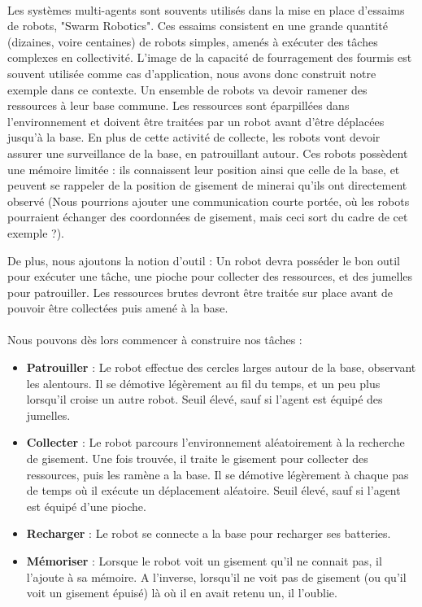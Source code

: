 		\paragraph{}
			Les systèmes multi-agents sont souvents utilisés dans la mise en place d'essaims de robots, "Swarm Robotics". Ces essaims consistent en une grande quantité (dizaines, voire centaines) de robots simples, amenés à exécuter des tâches complexes en collectivité. L'image de la capacité de fourragement des fourmis est souvent utilisée comme cas d'application, nous avons donc construit notre exemple dans ce contexte. Un ensemble de robots va devoir ramener des ressources à leur base commune. Les ressources sont éparpillées dans l'environnement et doivent être traitées par un robot avant d'être déplacées jusqu'à la base. En plus de cette activité de collecte, les robots vont devoir assurer une surveillance de la base, en patrouillant autour. Ces robots possèdent une mémoire limitée : ils connaissent leur position ainsi que celle de la base, et peuvent se rappeler de la position de gisement de minerai qu'ils ont directement observé (Nous pourrions ajouter une communication courte portée, où les robots pourraient échanger des coordonnées de gisement, mais ceci sort du cadre de cet exemple ?).
			
		De plus, nous ajoutons la notion d'outil : Un robot devra posséder le bon outil pour exécuter une tâche, une pioche pour collecter des ressources, et des jumelles pour patrouiller. Les ressources brutes devront être traitée sur place avant de pouvoir être collectées puis amené à la base.

		\paragraph{}
		Nous pouvons dès lors commencer à construire nos tâches :
		\begin{itemize}
			\item \textbf{Patrouiller} : Le robot effectue des cercles larges autour de la base, observant les alentours. Il se démotive légèrement au fil du temps, et un peu plus lorsqu'il croise un autre robot. Seuil élevé, sauf si l'agent est équipé des jumelles.
			\item \textbf{Collecter} : Le robot parcours l'environnement aléatoirement à la recherche de gisement. Une fois trouvée, il traite le gisement pour collecter des ressources, puis les ramène a la base. Il se démotive légèrement à chaque pas de temps où il exécute un déplacement aléatoire. Seuil élevé, sauf si l'agent est équipé d'une pioche.
			\item \textbf{Recharger} : Le robot se connecte a la base pour recharger ses batteries.
			\item \textbf{Mémoriser} : Lorsque le robot voit un gisement qu'il ne connait pas, il l'ajoute à sa mémoire. A l'inverse, lorsqu'il ne voit pas de gisement (ou qu'il voit un gisement épuisé) là où il en avait retenu un, il l'oublie.
		\end{itemize}
	
